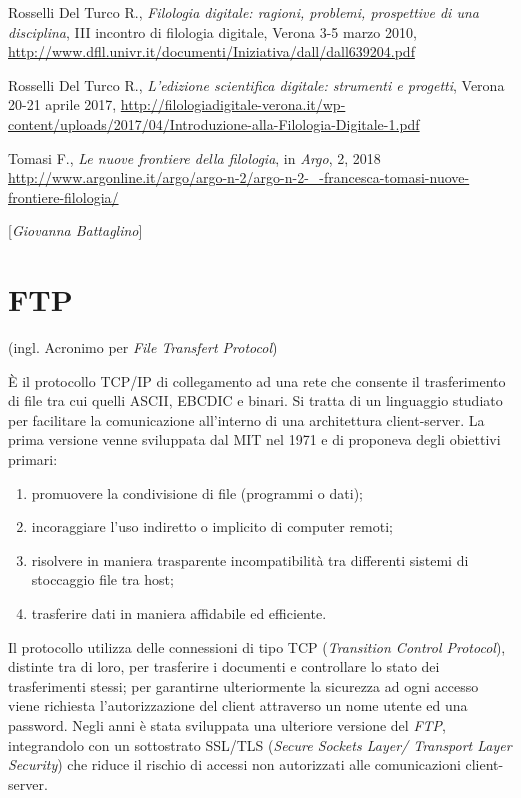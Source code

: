 {{{Rosselli Del Turco R., \emph{Filologia digitale: ragioni, problemi,
prospettive di una disciplina}, III incontro di filologia digitale,
Verona 3-5 marzo 2010,
\url{http://www.dfll.univr.it/documenti/Iniziativa/dall/dall639204.pdf}

Rosselli Del Turco R., \emph{L'edizione scientifica digitale: strumenti
e progetti}, Verona 20-21 aprile 2017,
\url{http://filologiadigitale-verona.it/wp-content/uploads/2017/04/Introduzione-alla-Filologia-Digitale-1.pdf}

Tomasi F., \emph{Le nuove frontiere della filologia}, in \emph{Argo}, 2,
2018
\url{http://www.argonline.it/argo/argo-n-2/argo-n-2-_-francesca-tomasi-nuove-frontiere-filologia/}
}

\hrulefill 

{[}\emph{Giovanna Battaglino}{]}




\chapter{FTP}

(ingl. Acronimo per \emph{File Transfert Protocol})

È il protocollo TCP/IP di collegamento ad una rete che consente il
trasferimento di file tra cui quelli ASCII, EBCDIC e binari. Si tratta
di un linguaggio studiato per facilitare la comunicazione all'interno di
una architettura client-server. La prima versione venne sviluppata dal
MIT nel 1971 e di proponeva degli obiettivi primari:

\begin{enumerate}
\def\labelenumi{\arabic{enumi}.}
\item
  promuovere la condivisione di file (programmi o dati);
\item
  incoraggiare l'uso indiretto o implicito di computer remoti;
\item
  risolvere in maniera trasparente incompatibilità tra differenti
  sistemi di stoccaggio file tra host;
\item
  trasferire dati in maniera affidabile ed efficiente.
\end{enumerate}

Il protocollo utilizza delle connessioni di tipo TCP (\emph{Transition
Control Protocol}), distinte tra di loro, per trasferire i documenti e
controllare lo stato dei trasferimenti stessi; per garantirne
ulteriormente la sicurezza ad ogni accesso viene richiesta
l'autorizzazione del client attraverso un nome utente ed una password.
Negli anni è stata sviluppata una ulteriore versione del \emph{FTP},
integrandolo con un sottostrato SSL/TLS (\emph{Secure Sockets Layer/
Transport Layer Security}) che riduce il rischio di accessi non
autorizzati alle comunicazioni client-server.

}}
